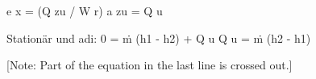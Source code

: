 e x = (Q zu / W r)  
a zu = Q u  

Stationär und adi:  
0 = ṁ (h1 - h2) + Q u  
Q u = ṁ (h2 - h1)  

[Note: Part of the equation in the last line is crossed out.]